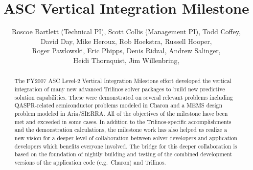 \documentclass[pdf,ps2pdf,11pt]{SANDreport}
\title{\center
ASC Vertical Integration Milestone
}
\author{
Roscoe Bartlett (Technical PI),
Scott Collis (Management PI),
Todd Coffey,\\
David Day,
Mike Heroux,
Rob Hoekstra,
Russell Hooper,\\
Roger Pawlowski,
Eric Phipps,
Denis Ridzal,
Andrew Salinger,\\
Heidi Thornquist,
Jim Willenbring,
}
\date{}
\begin{document}
\maketitle


%


%
\begin{abstract}
%

The FY2007 ASC Level-2 Vertical Integration Milestone effort developed the
vertical integration of many new advanced Trilinos solver packages to build
new predictive solution capabilities.  These were demonstrated on several
relevant problems including QASPR-related semiconductor problems modeled in
Charon and a MEMS design problem modeled in Aria/SIERRA.  All of the objectives of the
milestone have been met and exceeded in some cases.  In addition to the
Trilinos-specific accomplishments and the demonstration calculations, the
milestone work has also helped us realize a new vision for a deeper level of
collaboration between solver developers and application developers which
benefits everyone involved.  The bridge for this deeper collaboration is based
on the foundation of nightly building and testing of the combined development versions
of the application code (e.g.\ Charon) and Trilinos.

%

%
\end{abstract}
%

%
%
%
\end{document}
